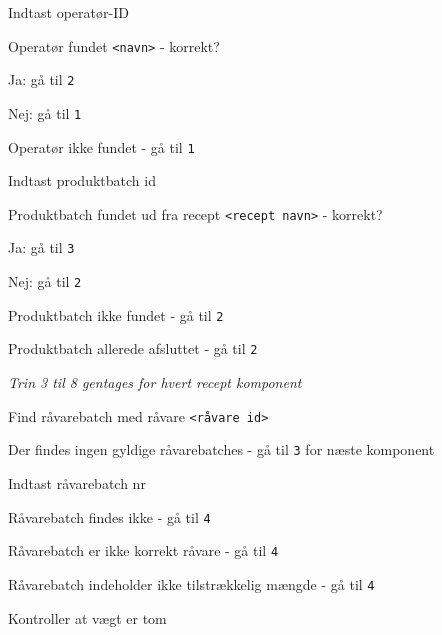\documentclass[a4paper]{article}
\newenvironment{my_enumerate}
{\begin{enumerate}
  \setlength{\itemsep}{1pt}
  \setlength{\parskip}{0pt}
  \setlength{\parsep}{0pt}}
{\end{enumerate}}
\begin{document}
\begin{my_enumerate}
  \item Indtast operatør-ID
    \begin{my_enumerate}
      \item Operatør fundet \texttt{<navn>} - korrekt?
        \begin{my_enumerate}
          \item Ja: gå til \texttt{2}
          \item Nej: gå til \texttt{1}
        \end{my_enumerate}
      \item Operatør ikke fundet - gå til \texttt{1}
    \end{my_enumerate}
  \item Indtast produktbatch id
    \begin{my_enumerate}
      \item Produktbatch fundet ud fra recept \texttt{<recept navn>} - korrekt?
        \begin{my_enumerate}
          \item Ja: gå til \texttt{3}
          \item Nej: gå til \texttt{2}
        \end{my_enumerate}
      \item Produktbatch ikke fundet - gå til \texttt{2}
      \item Produktbatch allerede afsluttet - gå til \texttt{2}
    \end{my_enumerate}
    \emph{Trin 3 til 8 gentages for hvert recept komponent}
  \item Find råvarebatch med råvare \texttt{<råvare id>}
    \begin{my_enumerate}
      \item Der findes ingen gyldige råvarebatches - gå til \texttt{3} for næste komponent
    \end{my_enumerate}
  \item Indtast råvarebatch nr
    \begin{my_enumerate}
      \item Råvarebatch findes ikke - gå til \texttt{4}
      \item Råvarebatch er ikke korrekt råvare - gå til \texttt{4}
      \item Råvarebatch indeholder ikke tilstrækkelig mængde - gå til \texttt{4}
    \end{my_enumerate}
  \item Kontroller at vægt er tom
    \begin{my_enumerate}

\end{my_enumerate}
\end{my_enumerate}
\end{document}
